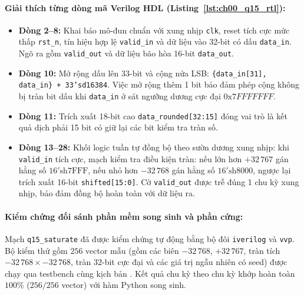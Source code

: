 \paragraph{Giải thích từng dòng mã Verilog HDL (Listing~\ref{lst:ch00_q15_rtl}):}
\begin{itemize}[leftmargin=1.4em]
    \item \textbf{Dòng 2--8:} Khai báo mô-đun chuẩn với xung nhịp \texttt{clk}, reset tích cực mức thấp \texttt{rst\_n}, tín hiệu hợp lệ \texttt{valid\_in} và dữ liệu vào 32-bit có dấu \texttt{data\_in}. Ngõ ra gồm \texttt{valid\_out} và dữ liệu bão hòa 16-bit \texttt{data\_out}.
    \item \textbf{Dòng 10:} Mở rộng dấu lên 33-bit và cộng nửa LSB: \texttt{\{data\_in[31], data\_in\} + 33'sd16384}. Việc mở rộng thêm 1 bit bảo đảm phép cộng không bị tràn bit dấu khi \texttt{data\_in} ở sát ngưỡng dương cực đại $0\text{x}7FFFFFFF$.
    \item \textbf{Dòng 11:} Trích xuất 18-bit cao \texttt{data\_rounded[32:15]} đóng vai trò là kết quả dịch phải 15 bit có giữ lại các bit kiểm tra tràn số.
    \item \textbf{Dòng 13--28:} Khối logic tuần tự đồng bộ theo sườn dương xung nhịp: khi \texttt{valid\_in} tích cực, mạch kiểm tra điều kiện tràn: nếu lớn hơn $+32\,767$ gán hằng số $16'\text{sh7FFF}$, nếu nhỏ hơn $-32\,768$ gán hằng số $16'\text{sh8000}$, ngược lại trích xuất 16-bit \texttt{shifted[15:0]}. Cờ \texttt{valid\_out} được trễ đúng 1 chu kỳ xung nhịp, bảo đảm đồng bộ hoàn toàn với dữ liệu ra.
\end{itemize}

\paragraph{Kiểm chứng đối sánh phần mềm song sinh và phần cứng:}
Mạch \texttt{q15\_saturate} đã được kiểm chứng tự động bằng bộ đôi \texttt{iverilog} và \texttt{vvp}. Bộ kiểm thử gồm $256$ vector mẫu (gồm các biên $-32\,768$, $+32\,767$, tràn tích $-32\,768 \times -32\,768$, tràn $32$-bit cực đại và các giá trị ngẫu nhiên có seed) được chạy qua testbench  cùng kịch bản . Kết quả chu kỳ theo chu kỳ khớp hoàn toàn $100\%$ ($256/256$ vector) với hàm Python song sinh.

